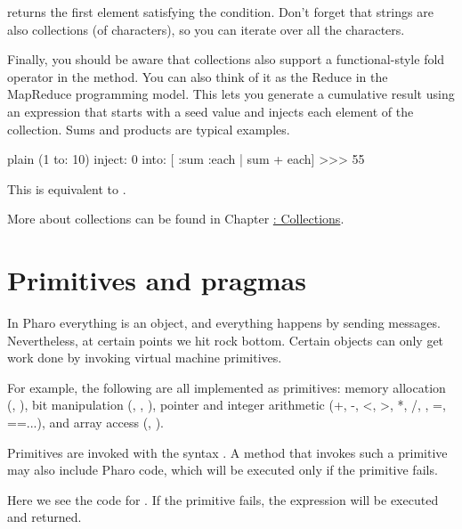 \documentclass[10pt,twoside,english]{_support/latex/sbabook/sbabook}
\begin{document}
 returns the first element satisfying the condition. Don't forget
that strings are also collections (of characters), so you can iterate over all
the characters.


Finally, you should be aware that collections also support a functional-style
fold operator in the  method. You can also think of it as the
Reduce in the MapReduce programming model. This lets you generate a cumulative
result using an expression that starts with a seed value and injects each
element of the collection. Sums and products are typical examples.

\begin{displaycode}{plain}
(1 to: 10) inject: 0 into: [ :sum :each | sum + each] 
>>> 55
\end{displaycode}

This is equivalent to .

More about collections can be found in Chapter
\hyperref[cha:collections]{: Collections}.
\section{Primitives and pragmas}
In Pharo everything is an object, and everything happens by sending messages.
Nevertheless, at certain points we hit rock bottom. Certain objects can only get
work done by invoking virtual machine primitives.

For example, the following are all implemented as primitives: memory allocation
(, ), bit manipulation (, , ),
pointer and integer arithmetic (+, -, \textless{}, \textgreater{}, *, /, , =, ==...), and
array access (, ).

Primitives are invoked with the syntax . A method that
invokes such a primitive may also include Pharo code, which will be
executed only if the primitive fails.

Here we see the code for . If the primitive fails, the
expression  will be executed and returned.
\end{document}
